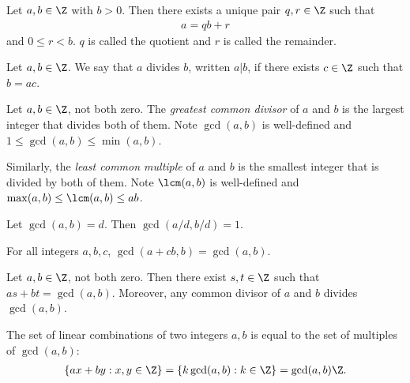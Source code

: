 \documentclass{article}
\begin{document}
\begin{theorem}
    Let $a,b\in\Z$ with $b>0$. Then there exists a unique pair $q,r\in\Z$ such that
    \begin{align*}
        a = qb + r
    \end{align*}
    and $0\leq r<b$. $q$ is called the quotient and $r$ is called the remainder.
\end{theorem}

\begin{definition}
    Let $a,b\in\Z$. We say that $a$ divides $b$, written $a|b$, if there exists $c\in\Z$
    such that $b=ac$.
\end{definition}

\begin{definition}
    Let $a,b\in\Z$, not both zero. The \emph{greatest common divisor} of $a$ and $b$ is the largest integer
    that divides both of them. Note $\gcd(a,b)$ is well-defined and $1\leq\gcd(a,b)\leq\min(a,b)$.

    Similarly, the \emph{least common multiple} of $a$ and $b$ is the smallest 
    integer that is divided by both of them. Note $\lcm(a,b)$ is well-defined
    and $\max(a,b)\leq\lcm(a,b)\leq ab$.
\end{definition}

\begin{proposition}[Boocher 3.3]
    Let $\gcd(a,b)=d$. Then $\gcd(a/d,b/d)=1$.
\end{proposition}

\begin{proposition}[Boocher 3.4]
    For all integers $a,b,c$, $\gcd(a+cb,b)=\gcd(a,b)$.
\end{proposition}

\begin{lemma}[Bezout]
    Let $a,b\in\Z$, not both zero. Then there exist $s,t\in\Z$ such that
    $as + bt = \gcd(a,b)$. Moreover, any common divisor of $a$ and $b$ divides $\gcd(a,b)$.
\end{lemma}

\begin{corollary}[Boocher 3.7]
    The set of linear combinations of two integers $a,b$ is equal to the set 
    of multiples of $\gcd(a,b)$:
    \begin{align*}
        \{ax+by : x,y\in\Z \} = \{k\gcd(a,b):k\in\Z\}=\gcd(a,b)\Z.
    \end{align*}
\end{corollary}
\end{document}
